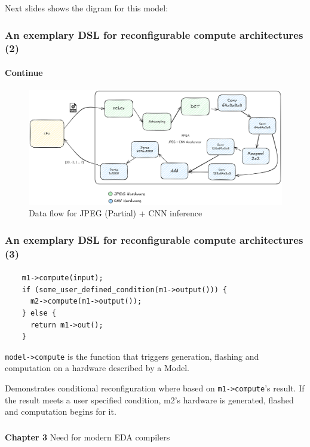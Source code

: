 \documentclass{beamer}
\begin{document}
{\begin{frame}[fragile]
  Next slides shows the digram for this model:

\end{frame}

\begin{frame}[fragile]
  \frametitle{An exemplary DSL for reconfigurable compute architectures (2)}
\framesubtitle{Continue}
   \begin{figure}
        \centering
        \includegraphics[width=1\linewidth]{flowcnnjpeg.png}
        \caption{Data flow for JPEG (Partial) + CNN inference}
    \end{figure}
\end{frame}

\begin{frame}[fragile]
  \frametitle{An exemplary DSL for reconfigurable compute architectures (3)}
\framesubtitle{}
  \begin{verbatim}
    m1->compute(input);
    if (some_user_defined_condition(m1->output())) {
      m2->compute(m1->output());
    } else {
      return m1->out();
    }
\end{verbatim}
  \texttt{model->compute} is the function that triggers generation, flashing and
  computation on a hardware described by a Model.

  Demonstrates conditional reconfiguration where based on \texttt{m1->compute}'s
  result. If the result meets a user specified condition, m2's hardware is
  generated, flashed and computation begins for it.
\end{frame}

\begin{frame}[c,fragile]
  \frametitle{}

  \centering
  \textbf{Chapter 3} 
  \centering
  Need for modern EDA compilers
\end{frame}

\newcommand\myheading[1]{%
  \par\bigskip
  {\Large\bfseries#1}\par\smallskip}

}
\end{document}
